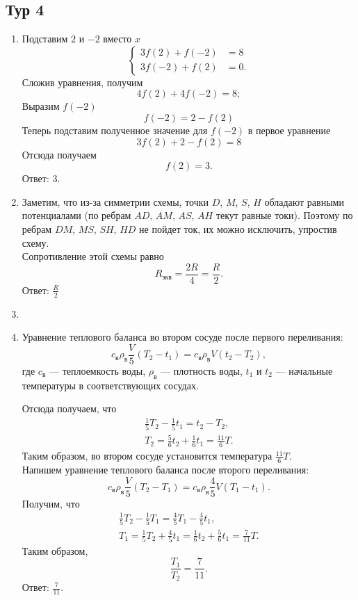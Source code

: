 \documentclass[12pt]{article} %
\begin{document}
\subsection*{Тур 4}

\begin{enumerate}
    \item 
        Подставим $2$ и $-2$ вместо $x$
        \[
            \left\{
            \begin{aligned}
            3f(2) + f(-2) &= 8\\
            3f(-2) + f(2) &= 0.
            \end{aligned}
            \right.
        \]
        Сложив уравнения, получим
        \[
            4f(2)+4f(-2) = 8;
        \]
        Выразим $f(-2)$
        \[
            f(-2) = 2 - f(2)
        \]
        Теперь подставим полученное значение для $f(-2)$ в первое уравнение
        \[
            3f(2) + 2 - f(2) = 8
        \]
        Отсюда получаем
        \[
            f(2)=3.
        \]
        Ответ: $3$.
    \item 
        Заметим, что из-за симметрии схемы, точки $D$, $M$, $S$, $H$ 
        обладают равными потенциалами (по ребрам $AD$, $AM$, $AS$, $AH$ текут равные токи). Поэтому по ребрам $DM$, $MS$, $SH$, $HD$ не пойдет ток, их можно исключить, упростив схему.\\
        Сопротивление этой схемы равно
        \[
            R_{\text{экв}}=\frac{2R}{4}=\frac{R}{2}.
        \]
        Ответ: $\frac{R}{2}$ %
    \item
    \item 
        Уравнение теплового баланса во втором сосуде после первого переливания:
        \[
            c_{\text{в}}\rho_{\text{в}}\frac{V}{5}(T_2-t_1) = c_{\text{в}}\rho_{\text{в}}V(t_2 - T_2),
        \]
        где $c_{\text{в}}$ — теплоемкость воды, $\rho_{\text{в}}$ — плотность воды, $t_1$ и $t_2$ — начальные температуры в соответствующих сосудах.
        
        Отсюда получаем, что
        \begin{align}
            \frac{1}{5}T_2-\frac{1}{5}t_1 = t_2 - T_2,\\
            T_2 = \frac{5}{6}t_2 + \frac{1}{6}t_1 = \frac{11}{6}T.
        \end{align}
        Таким образом, во втором сосуде установится температура $\frac{11}{6}T$.\\
        Напишем уравнение теплового баланса после второго переливания:
        \[
            c_{\text{в}}\rho_{\text{в}}\frac{V}{5}(T_2 - T_1) = c_{\text{в}}\rho_{\text{в}}\frac{4}{5}V(T_1-t_1).
        \]
        Получим, что
        \begin{align}
            \frac{1}{5}T_2 - \frac{1}{5}T_1 = \frac{4}{5}T_1 - \frac{4}{5}t_1,\\
            T_1 = \frac{1}{5}T_2 + \frac{4}{5}t_1 = \frac{1}{6}t_2 + \frac{5}{6}t_1 = \frac{7}{11}T.
        \end{align}
        Таким образом, 
         \[
            \frac{T_{1}}{T_{2}} = \frac{7}{11}. 
        \]
        Ответ: $\frac{7}{11}$.
        

\end{enumerate}
\end{document}

